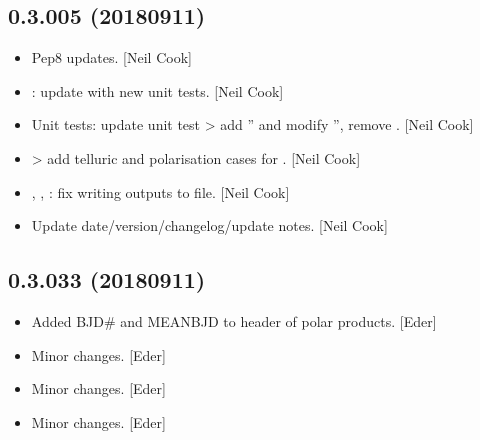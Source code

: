 \documentclass[a4paper,10pt,english]{report}
\begin{document}
\subsection{0.3.005 (2018\sphinxhyphen{}09\sphinxhyphen{}11)}
\label{\detokenize{misc/changelog:id348}}\begin{itemize}
\item {} 
Pep8 updates. {[}Neil Cook{]}

\item {} 
: update with new unit tests. {[}Neil Cook{]}

\item {} 
Unit tests: update unit test \textendash{}\textgreater{} add ” and modify
”, remove . {[}Neil Cook{]}

\item {} 
 \textendash{}\textgreater{} add telluric and polarisation cases for
. {[}Neil Cook{]}

\item {} 
, , : fix writing outputs
to file. {[}Neil Cook{]}

\item {} 
Update date/version/changelog/update notes. {[}Neil Cook{]}

\end{itemize}


\subsection{0.3.033 (2018\sphinxhyphen{}09\sphinxhyphen{}11)}
\label{\detokenize{misc/changelog:id349}}\begin{itemize}
\item {} 
Added BJD\# and MEANBJD to header of polar products. {[}Eder{]}

\item {} 
Minor changes. {[}Eder{]}

\item {} 
Minor changes. {[}Eder{]}

\item {} 
Minor changes. {[}Eder{]}

\end{itemize}
\end{document}
